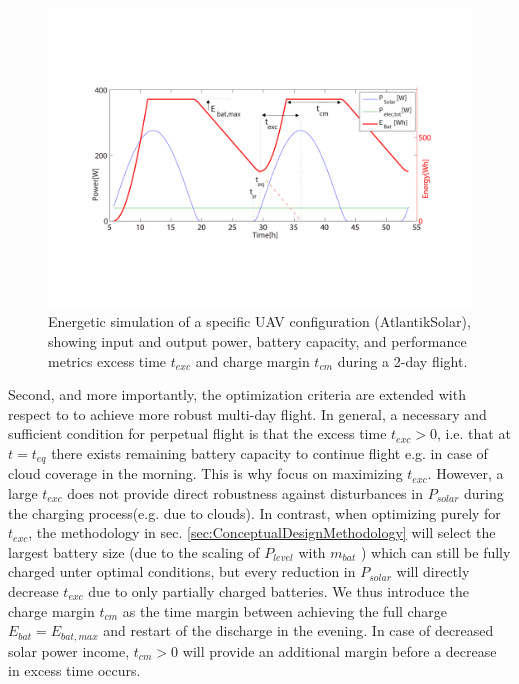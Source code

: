 \begin{figure}[tb]
    \centering
    \includegraphics[width=\linewidth]{images/2_EnergySimulation}
    \caption{Energetic simulation of a specific UAV configuration (AtlantikSolar), showing input and output power, battery capacity, and performance metrics excess time $t_{exc}$ and charge margin $t_{cm}$ during a 2-day flight.}
    \label{fig:EnergySimulation}
\end{figure}

Second, and more importantly, the optimization criteria are extended with respect to \cite{Noth_PhD,Leutenegger_JIRS} to achieve more robust multi-day flight. In general, a necessary and sufficient condition for perpetual flight is that the excess time $t_{exc}>0$, i.e. that at $t=t_{eq}$ there exists remaining battery capacity to continue flight e.g. in case of cloud coverage in the morning. This is why\cite{Noth_PhD,Leutenegger_JIRS} focus on maximizing $t_{exc}$. However, a large $t_{exc}$ does not provide direct robustness against disturbances in $P_{solar}$ during the charging process(e.g. due to clouds). In contrast, when optimizing purely for $t_{exc}$, the methodology in sec. \ref{sec:ConceptualDesignMethodology} will select the largest battery size (due to the scaling of $P_{level}$ with $m_{bat}$ ) which can still be fully charged unter optimal conditions, but every reduction in $P_{solar}$ will directly decrease $t_{exc}$ due to only partially charged batteries. We thus introduce the charge margin $t_{cm}$ as the time margin between achieving the full charge $E_{bat}=E_{bat,max}$ and restart of the discharge in the evening. In case of decreased solar power income, $t_{cm}>0$ will provide an additional margin before a decrease in excess time occurs.

